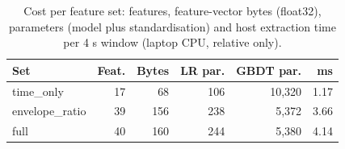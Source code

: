 \begin{table}[t]
\caption{Cost per feature set: features, feature-vector bytes (float32), parameters (model plus standardisation) and host extraction time per 4 s window (laptop CPU, relative only).}
\label{tab:cost}
\centering
\setlength{\tabcolsep}{3pt}
\begin{tabular}{lrrrrr}
\hline
Set & Feat. & Bytes & LR par. & GBDT par. & ms \\
\hline
time\_only & 17 & 68 & 106 & 10,320 & 1.17 \\
envelope\_ratio & 39 & 156 & 238 & 5,372 & 3.66 \\
full & 40 & 160 & 244 & 5,380 & 4.14 \\
\hline
\end{tabular}
\end{table}
